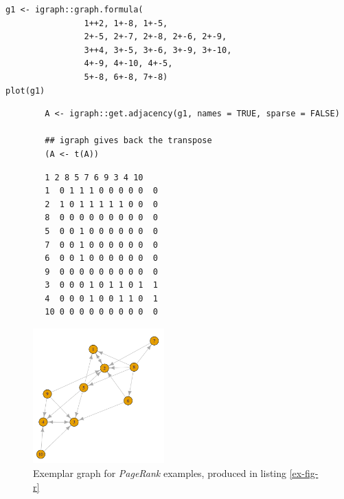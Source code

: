 \documentclass[11pt, twoside]{report}
\begin{document}
\begin{listing}[htbp]
\begin{tcolorbox}
\begin{verbatim}
g1 <- igraph::graph.formula(
                1++2, 1+-8, 1+-5,
                2+-5, 2+-7, 2+-8, 2+-6, 2+-9,
                3++4, 3+-5, 3+-6, 3+-9, 3+-10,
                4+-9, 4+-10, 4+-5,
                5+-8, 6+-8, 7+-8)
plot(g1)
\end{verbatim}
\caption{\label{ex-fig-r}Produce exemplar graph in figure \ref{example-rs-graph}}
\end{tcolorbox}
\end{listing}





\begin{listing}[htbp]
    \begin{tcolorbox}
        \begin{verbatim}
        A <- igraph::get.adjacency(g1, names = TRUE, sparse = FALSE)

        ## igraph gives back the transpose
        (A <- t(A))
        \end{verbatim}
        \caption{\label{adj-mat-random-surf}Return the Adjacency Matrix corresponding to figure \ref{example-rs-graph}}
    \tcblower
        \begin{verbatim}
        1 2 8 5 7 6 9 3 4 10
        1  0 1 1 1 0 0 0 0 0  0
        2  1 0 1 1 1 1 1 0 0  0
        8  0 0 0 0 0 0 0 0 0  0
        5  0 0 1 0 0 0 0 0 0  0
        7  0 0 1 0 0 0 0 0 0  0
        6  0 0 1 0 0 0 0 0 0  0
        9  0 0 0 0 0 0 0 0 0  0
        3  0 0 0 1 0 1 1 0 1  1
        4  0 0 0 1 0 0 1 1 0  1
        10 0 0 0 0 0 0 0 0 0  0
        \end{verbatim}
    \end{tcolorbox}
\end{listing}


\begin{figure}
\begin{center}
\includegraphics[width=0.45\textwidth]{media/example-graph-power-walk.png}
\end{center}
\caption{\label{example-rs-graph}Exemplar graph for \emph{PageRank} examples, produced in listing \ref{ex-fig-r}}
\end{figure}
\end{document}
